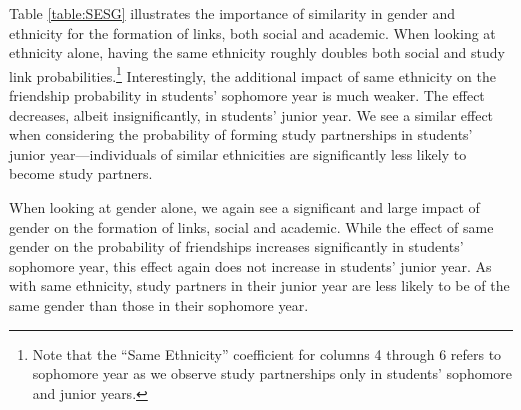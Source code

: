 \documentclass[12pt,letterpaper,english]{article}
\begin{document}





Table \ref{table:SESG} illustrates the importance of similarity in gender and ethnicity for the formation of links, both social and academic. When looking at ethnicity alone, having the same ethnicity roughly doubles both social and study link probabilities.\footnote{Note that the ``Same Ethnicity'' coefficient for columns 4 through 6 refers to sophomore year as we observe study partnerships only in students' sophomore and junior years.} Interestingly, the additional impact of same ethnicity on the friendship probability in students' sophomore year is much weaker. The effect decreases, albeit insignificantly, in students' junior year. We see a similar effect when considering the probability of forming study partnerships in students' junior year---individuals of similar ethnicities are significantly less likely to become study partners. 

When looking at gender alone, we again see a significant and large impact of gender on the formation of links, social and academic. While the effect of same gender on the probability of friendships increases significantly in students' sophomore year, this effect again does not increase in students' junior year. As with same ethnicity, study partners in their junior year are less likely to be of the same gender than those in their sophomore year. 
\end{document}
